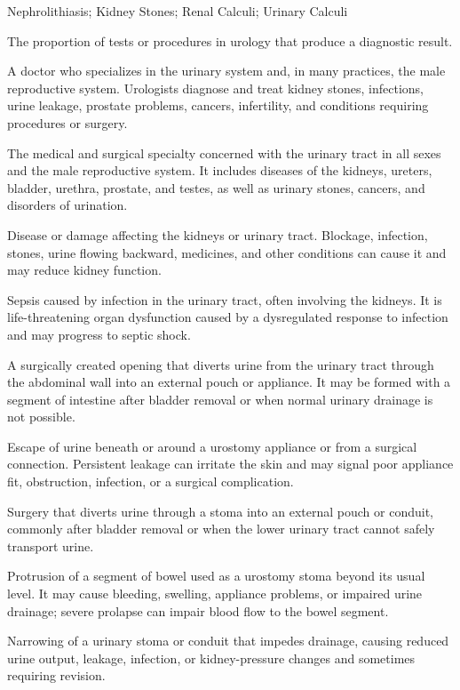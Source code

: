 \synonyms
Nephrolithiasis; Kidney Stones; Renal Calculi; Urinary Calculi

 The proportion of tests or procedures in urology that produce a diagnostic result.

 A doctor who specializes in the urinary system and, in many practices, the male reproductive system. Urologists diagnose and treat kidney stones, infections, urine leakage, prostate problems, cancers, infertility, and conditions requiring procedures or surgery.

 The medical and surgical specialty concerned with the urinary tract in all sexes and the male reproductive system. It includes diseases of the kidneys, ureters, bladder, urethra, prostate, and testes, as well as urinary stones, cancers, and disorders of urination.

 Disease or damage affecting the kidneys or urinary tract. Blockage, infection, stones, urine flowing backward, medicines, and other conditions can cause it and may reduce kidney function.

 Sepsis caused by infection in the urinary tract, often involving the kidneys. It is life-threatening organ dysfunction caused by a dysregulated response to infection and may progress to septic shock.

 A surgically created opening that diverts urine from the urinary tract through the abdominal wall into an external pouch or appliance. It may be formed with a segment of intestine after bladder removal or when normal urinary drainage is not possible.

 Escape of urine beneath or around a urostomy appliance or from a surgical connection. Persistent leakage can irritate the skin and may signal poor appliance fit, obstruction, infection, or a surgical complication.

 Surgery that diverts urine through a stoma into an external pouch or conduit, commonly after bladder removal or when the lower urinary tract cannot safely transport urine.

 Protrusion of a segment of bowel used as a urostomy stoma beyond its usual level. It may cause bleeding, swelling, appliance problems, or impaired urine drainage; severe prolapse can impair blood flow to the bowel segment.

 Narrowing of a urinary stoma or conduit that impedes drainage, causing reduced urine output, leakage, infection, or kidney-pressure changes and sometimes requiring revision.

